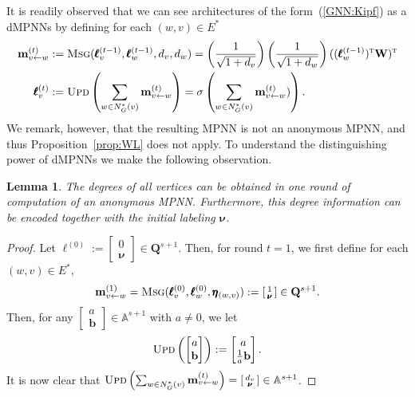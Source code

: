 \documentclass[10pt,a4paper]{article}
\newtheorem{lemma}{Lemma}[section]
\theoremstyle{definition}
\begin{document}
It is readily observed that we can see architectures of the form~(\ref{GNN:Kipf}) as a dMPNNs by defining for each $(w,v)\in E^*$
\begin{align*}
\mathbf{m}_{v\gets w}^{(t)}&:=	
\textsc{Msg}(\pmb{\ell}^{(t-1)}_v,\pmb{\ell}^{(t-1)}_w,d_v,d_w)=
	\left(\frac{1}{\sqrt{1+d_v}}\right)	\left(\frac{1}{\sqrt{1+d_w}}\right)((\pmb{\ell}^{(t-1)}_w)^{\textsc{t}}\mathbf{W})^{\textsc{t}}\\
\pmb{\ell}_v^{(t)}&:=\textsc{Upd}\left(\sum_{w\in N_G^*(v)} \mathbf{m}_{v\gets w}^{(t)}\right)=
\sigma\left(\sum_{w\in N_G^*(v)} \mathbf{m}_{v\gets w}^{(t)})\right).
\end{align*}
We remark, however, that the resulting MPNN is not an anonymous MPNN, and thus Proposition~\ref{prop:WL} does not apply. To understand the distinguishing power of dMPNNs we make the following observation. 

\begin{lemma}
	The degrees of all vertices can be obtained in one round of computation of an anonymous MPNN. Furthermore, this degree information can be encoded together with the initial labeling $\pmb{\nu}$.
	\end{lemma}
\begin{proof}
Let $\pmb{\ell}^{(0)}:=\left[\begin{smallmatrix}0\\\pmb{\nu}\end{smallmatrix}\right]\in\mathbf{Q}^{s+1}$. Then, for round $t=1$, we first define for each $(w,v)\in E^*$, 
$$\mathbf{m}^{(1)}_{v\gets w}=\textsc{Msg}(\pmb{\ell}^{(0)}_v,\pmb{\ell}^{(0)}_{w},\pmb{\eta}_{(w,v)}):=\left[\begin{smallmatrix}1\\\pmb{\nu}\end{smallmatrix}\right]\in\mathbf{Q}^{s+1}.$$ Then, for any
$\left[\begin{smallmatrix} a\\\mathbf{b}\end{smallmatrix}\right]\in \mathbb{A}^{s+1}$ with $a\neq 0$, we 
let 
$$\textsc{Upd}\left(\begin{bmatrix} a\\\mathbf{b}\end{bmatrix}\right):=\begin{bmatrix} a\\\frac{1}{a}\mathbf{b}\end{bmatrix}.
$$
It is now clear that $\textsc{Upd}\left(\sum_{w\in N_G^*(v)}\mathbf{m}_{v\gets w}^{(t)}\right)=\left[\begin{smallmatrix} d_v\\\pmb{\nu}\end{smallmatrix}\right]\in \mathbb{A}^{s+1}$.
\end{proof}
\end{document}
